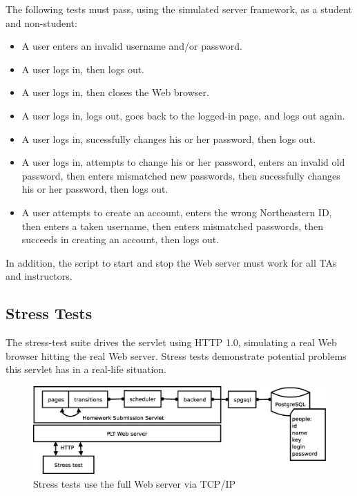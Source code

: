 \documentclass[a4paper]{article}
\begin{document}

The following tests must pass, using the simulated server framework, as a
student and non-student:

\begin{itemize}
\item{A user enters an invalid username and/or password.}
\item{A user logs in, then logs out.}
\item{A user logs in, then closes the Web browser.}
\item{A user logs in, logs out, goes back to the logged-in page, and logs out
again.}
\item{A user logs in, sucessfully changes his or her password, then logs out.}
\item{A user logs in, attempts to change his or her password, enters an invalid
old password, then enters mismatched new passwords, then sucessfully changes his or
her password, then logs out.}
\item{A user attempts to create an account, enters the wrong Northeastern ID,
then enters a taken username, then enters mismatched passwords, then succeeds
in creating an account, then logs out.}
\end{itemize}

In addition, the script to start and stop the Web server must work for all TAs
and instructors.

\subsection{Stress Tests}\label{subsec:stresstests}

The stress-test suite drives the servlet using HTTP 1.0, simulating a real Web
browser hitting the real Web server. Stress tests demonstrate potential
problems this servlet has in a real-life situation.

\begin{figure}[ht]
\centering
\includegraphics[scale=.30]{stress-test.eps}
\caption{Stress tests use the full Web server via TCP/IP}
\label{fig:stress-tests}
\end{figure}
\end{document}
